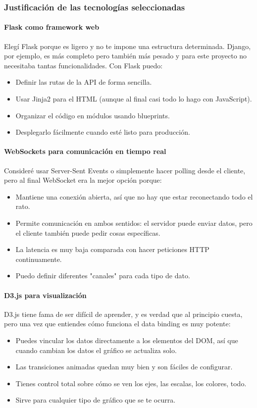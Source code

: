 \documentclass[12pt,a4paper]{article}
\begin{document}
\subsubsection{Justificación de las tecnologías seleccionadas}

\paragraph{Flask como framework web}
Elegí Flask porque es ligero y no te impone una estructura determinada. Django, por ejemplo, es más completo pero también más pesado y para este proyecto no necesitaba tantas funcionalidades. Con Flask puedo:
\begin{itemize}
    \item Definir las rutas de la API de forma sencilla.
    \item Usar Jinja2 para el HTML (aunque al final casi todo lo hago con JavaScript).
    \item Organizar el código en módulos usando blueprints.
    \item Desplegarlo fácilmente cuando esté listo para producción.
\end{itemize}

\paragraph{WebSockets para comunicación en tiempo real}
Consideré usar Server-Sent Events o simplemente hacer polling desde el cliente, pero al final WebSocket era la mejor opción porque:
\begin{itemize}
    \item Mantiene una conexión abierta, así que no hay que estar reconectando todo el rato.
    \item Permite comunicación en ambos sentidos: el servidor puede enviar datos, pero el cliente también puede pedir cosas específicas.
    \item La latencia es muy baja comparada con hacer peticiones HTTP continuamente.
    \item Puedo definir diferentes "canales" para cada tipo de dato.
\end{itemize}

\paragraph{D3.js para visualización}
D3.js tiene fama de ser difícil de aprender, y es verdad que al principio cuesta, pero una vez que entiendes cómo funciona el data binding es muy potente:
\begin{itemize}
    \item Puedes vincular los datos directamente a los elementos del DOM, así que cuando cambian los datos el gráfico se actualiza solo.
    \item Las transiciones animadas quedan muy bien y son fáciles de configurar.
    \item Tienes control total sobre cómo se ven los ejes, las escalas, los colores, todo.
    \item Sirve para cualquier tipo de gráfico que se te ocurra.
\end{itemize}
\end{document}
